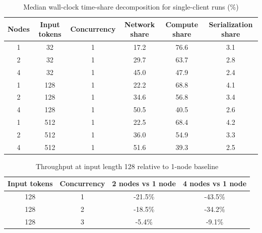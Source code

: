 \documentclass[conference]{IEEEtran}
\begin{document}
\begin{table}[ht]
\caption{Median wall-clock time-share decomposition for single-client runs (\%)}
\label{tab:raw_share}
\centering
\begin{tabular}{|c|c|c|c|c|c|}
\hline
Nodes & Input tokens & Concurrency & Network share & Compute share & Serialization share \\
\hline
1 & 32 & 1 & 17.2 & 76.6 & 3.1 \\
2 & 32 & 1 & 29.7 & 63.7 & 2.8 \\
4 & 32 & 1 & 45.0 & 47.9 & 2.4 \\
1 & 128 & 1 & 22.2 & 68.8 & 4.1 \\
2 & 128 & 1 & 34.6 & 56.8 & 3.4 \\
4 & 128 & 1 & 50.5 & 40.5 & 2.6 \\
1 & 512 & 1 & 22.5 & 68.4 & 4.2 \\
2 & 512 & 1 & 36.0 & 54.9 & 3.3 \\
4 & 512 & 1 & 51.6 & 39.3 & 2.5 \\
\hline
\end{tabular}
\end{table}

\begin{table}[ht]
\caption{Throughput at input length 128 relative to 1-node baseline}
\label{tab:raw_tput_rel}
\centering
\begin{tabular}{|c|c|c|c|}
\hline
Input tokens & Concurrency & 2 nodes vs 1 node & 4 nodes vs 1 node \\
\hline
128 & 1 & -21.5\% & -43.5\% \\
128 & 2 & -18.5\% & -34.2\% \\
128 & 3 & -5.4\% & -9.1\% \\
\hline
\end{tabular}
\end{table}
\end{document}
